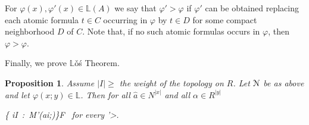 \documentclass[12pt,letterpaper,oneside,reqno]{amsart}
\theoremstyle{plain}
\newtheorem{proposition}[theorem]{Proposition}
\theoremstyle{remark}
\begin{document}


For $\varphi(x),\varphi'(x)\in\mathds{L}(A)$ we say that $\varphi'>\varphi$ if $\varphi'$ can be obtained replacing each atomic formula $t\in C$ occurring in $\varphi$ by $t\in D$ for some compact neighborhood $D$ of $C$.
Note that, if no such atomic formulas occurs in $\varphi$, then $\varphi>\varphi$.

Finally, we prove $\mathds{L}$\v{o}\'s Theorem.

\begin{proposition}\label{thm_Los}
  Assume $|I|\ge$ the weight of the topology on $R$.
  Let ${\EuScript N}$ be as above and let $\varphi(x;y)\in\mathds{L}$.
  Then for all $\hat a\in N^{|x|}$ and all $\alpha\in R^{|y|}$

  {\Leftrightarrow}
  {\big\{ i\in I\ :\ {\EuScript M}\models\varphi'(\hat ai;\alpha)\big\}\in F \ \textrm{for every }\varphi'>\varphi.}

\end{proposition}
\end{document}
